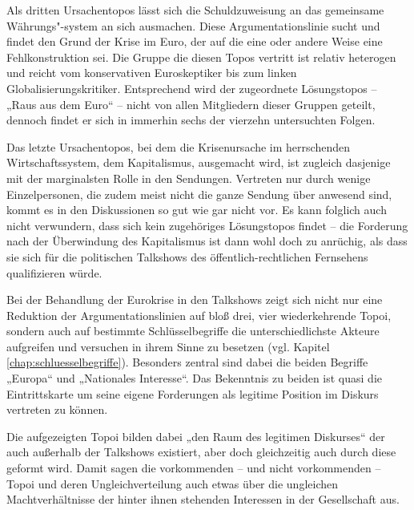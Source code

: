 Als dritten Ursachentopos lässt sich die Schuldzuweisung an das gemeinsame Währungs"-system an sich ausmachen. Diese Argumentationslinie sucht und findet den Grund der Krise im Euro, der auf die eine oder andere Weise eine Fehlkonstruktion sei. Die Gruppe die diesen Topos vertritt ist relativ heterogen und reicht vom konservativen Euroskeptiker bis zum linken Globalisierungskritiker. Entsprechend wird der zugeordnete Lösungstopos – „Raus aus dem Euro“ – nicht von allen Mitgliedern dieser Gruppen geteilt, dennoch findet er sich in immerhin sechs der vierzehn untersuchten Folgen.

Das letzte Ursachentopos, bei dem die Krisenursache im herrschenden Wirtschaftssystem, dem Kapitalismus, ausgemacht wird, ist zugleich dasjenige mit der marginalsten Rolle in den Sendungen. Vertreten nur durch wenige Einzelpersonen, die zudem meist nicht die ganze Sendung über anwesend sind, kommt es in den Diskussionen so gut wie gar nicht vor. Es kann folglich auch nicht verwundern, dass sich kein zugehöriges Lösungstopos findet – die Forderung nach der Überwindung des Kapitalismus ist dann wohl doch zu anrüchig, als dass sie sich für die politischen Talkshows des öffentlich-rechtlichen Fernsehens qualifizieren würde.

Bei der Behandlung der Eurokrise in den Talkshows zeigt sich nicht nur eine Reduktion der Argumentationslinien auf bloß drei, vier wiederkehrende Topoi, sondern auch auf bestimmte Schlüsselbegriffe die unterschiedlichste Akteure aufgreifen und versuchen in ihrem Sinne zu besetzen (vgl. Kapitel \vref{chap:schluesselbegriffe}). Besonders zentral sind dabei die beiden Begriffe „Europa“ und „Nationales Interesse“. Das Bekenntnis zu beiden ist quasi die Eintrittskarte um seine eigene Forderungen als legitime Position im Diskurs vertreten zu können.

Die aufgezeigten Topoi bilden dabei „den Raum des legitimen Diskurses“ \parencite[142]{doernerPolitainmentPolitikMedialen2001} der auch außerhalb der Talkshows existiert, aber doch gleichzeitig auch durch diese geformt wird. Damit sagen die vorkommenden – und nicht vorkommenden – Topoi und deren Ungleichverteilung auch etwas über die ungleichen Machtverhältnisse der hinter ihnen stehenden Interessen in der Gesellschaft aus.

